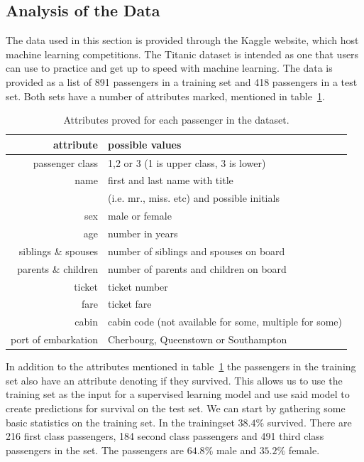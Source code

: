 \documentclass{llncs}
\begin{document}
\subsection{Analysis of the Data}
The data used in this section is provided through the Kaggle website, which host machine learning competitions. The Titanic dataset is intended as one that users can use to practice and get up to speed with machine learning. The data is provided as a list of 891 passengers in a training set and 418 passengers in a test set. Both sets have a number of attributes marked, mentioned in table~\ref{tab:passenger_attributes}.
\begin{table}[H]
\caption{Attributes proved for each passenger in the dataset.}
\label{tab:passenger_attributes}
\centering
\begin{tabular}{ r | l }
  attribute & possible values \\ \hline \hline
  passenger class & 1,2 or 3 (1 is upper class, 3 is lower)  \\
  name & first and last name with title \\
  & (i.e. mr., miss. etc) and possible initials  \\
  sex & male or female \\
  age & number in years \\
  siblings \& spouses & number of siblings and spouses on board \\
  parents \& children & number of parents and children on board \\
  ticket & ticket number \\
  fare & ticket fare \\
  cabin & cabin code (not available for some, multiple for some)\\
  port of embarkation & Cherbourg, Queenstown or Southampton

\end{tabular}
\end{table}
In addition to the attributes mentioned in table~\ref{tab:passenger_attributes} the passengers in the training set also have an attribute denoting if they survived. This allows us to use the training set as the input for a supervised learning model and use said model to create predictions for survival on the test set. 
We can start by gathering some basic statistics on the training set. In the trainingset $38.4\%$ survived. There are 216 first class passengers, 184 second class passengers and 491 third class passengers in the set. The passengers are $64.8\%$ male and $35.2\%$ female.\\
\end{document}
